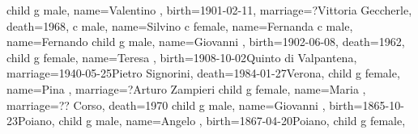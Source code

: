 \documentclass{article}
\begin{document}
\begin{midpage}
\begin{center}
\begin{genealogypicture}
{{{{{{{                        }
                    }
                    child{
                        g{
                            male,
                            name={Valentino },
                            birth={1901-02-11}{},
                            marriage={?}{Vittoria Geccherle},
                            death={1968}{},
                        }
                        c{
                            male,
                            name={Silvino }
                        }
                        c{
                            female,
                            name={Fernanda }
                        }
                        c{
                            male,
                            name={Fernando }
                        }
                    }
                    child{
                        g{
                            male,
                            name={Giovanni },
                            birth={1902-06-08}{},
                            death={1962}{},
                        }
                    }
                    child{
                        g{
                            female,
                            name={Teresa },
                            birth={1908-10-02}{Quinto di Valpantena},
                            marriage={1940-05-25}{Pietro Signorini},
                            death={1984-01-27}{Verona},
                        }
                    }
                    child{
                        g{
                            female,
                            name={Pina },
                            marriage={?}{Arturo Zampieri}
                        }
                    }
                    child{
                        g{
                            female,
                            name={Maria },
                            marriage={?}{? Corso},
                            death={1970}{}
                        }
                    }
                }
                child{
                    g{
                        male,
                        name={Giovanni },
                        birth={1865-10-23}{Poiano},
                    }
                }
                child{
                    g{
                        male,
                        name={Angelo },
                        birth={1867-04-20}{Poiano},
                    }
                }
                child{
                    g{
                        female,
}}}}}}
\end{genealogypicture}
\end{center}
\end{midpage}
\end{document}
